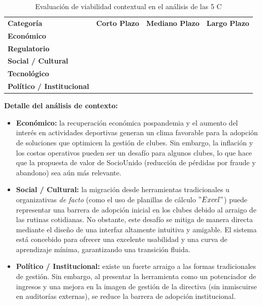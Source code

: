 \vspace{0.3cm}

\begin{table}[h!]
\centering
\renewcommand{\arraystretch}{1.5}
\begin{tabularx}{\textwidth}{|l|X|X|X|}
\hline
\rowcolor{red!20} \multicolumn{4}{|c|}{\textbf{CONTEXTO}} \\ \hline
\rowcolor{red!10} \textbf{Categoría} & \textbf{Corto Plazo} & \textbf{Mediano Plazo} & \textbf{Largo Plazo} \\ \hline
\textbf{Económico} & \cellcolor{orange!50} & \cellcolor{green!50} & \cellcolor{green!50} \\ \hline
\textbf{Regulatorio} & \cellcolor{green!50} & \cellcolor{green!50} & \cellcolor{green!50} \\ \hline
\textbf{Social / Cultural} & \cellcolor{orange!50} & \cellcolor{green!50} & \cellcolor{green!50} \\ \hline
\textbf{Tecnológico} & \cellcolor{green!50} & \cellcolor{green!50} & \cellcolor{green!50} \\ \hline
\textbf{Político / Institucional} & \cellcolor{orange!50} & \cellcolor{orange!50} & \cellcolor{green!50} \\ \hline
\end{tabularx}
\caption{Evaluación de viabilidad contextual en el análisis de las 5 C}
\end{table}

\vspace{0.3cm}

\textbf{Detalle del análisis de contexto:}
\begin{itemize}
    \item \textbf{Económico:} la recuperación económica pospandemia y el aumento del interés en actividades deportivas generan un clima favorable para la adopción de soluciones que optimicen la gestión de clubes. Sin embargo, la inflación y los costos operativos pueden ser un desafío para algunos clubes, lo que hace que la propuesta de valor de SocioUnido (reducción de pérdidas por fraude y abandono) sea aún más relevante.
    \item \textbf{Social / Cultural:} la migración desde herramientas tradicionales u organizativas \textit{de facto} (como el uso de planillas de cálculo $"Excel"$) puede representar una barrera de adopción inicial en los clubes debido al arraigo de las rutinas cotidianas. No obstante, este desafío se mitiga de manera directa mediante el diseño de una interfaz altamente intuitiva y amigable. El sistema está concebido para ofrecer una excelente usabilidad y una curva de aprendizaje mínima, garantizando una transición fluida.
    \item \textbf{Político / Institucional:} existe un fuerte arraigo a las formas tradicionales de gestión. Sin embargo, al presentar la herramienta como un potenciador de ingresos y una mejora en la imagen de gestión de la directiva (sin inmiscuirse en auditorías externas), se reduce la barrera de adopción institucional.
\end{itemize}

